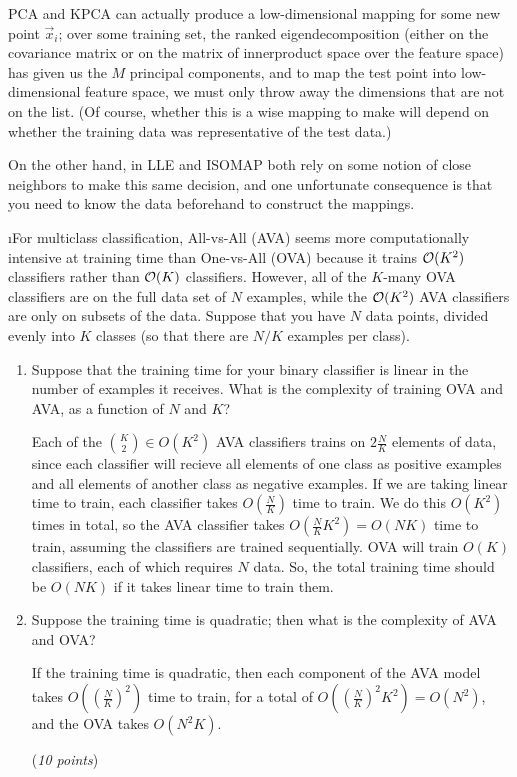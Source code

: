 \documentclass[fleqn]{article}
\begin{document}
\begin{solution}
PCA and KPCA can actually produce a low-dimensional mapping for some new point $\vec{x}_i$; over some training set, the ranked eigendecomposition (either on the covariance matrix or on the matrix of innerproduct space over the feature space) has given us the $M$ principal components, and to map the test point into low-dimensional feature space, we must only throw away the dimensions that are not on the list. (Of course, whether this is a wise mapping to make will depend on whether the training data was representative of the test data.) \newline

On the other hand, in LLE and ISOMAP both rely on some notion of close neighbors to make this same decision, and one unfortunate consequence is that you need to know the data beforehand to construct the mappings.
\end{solution}

\i For multiclass classification, All-vs-All (AVA) seems more computationally 
intensive at training time than One-vs-All (OVA) because it trains $\mathcal{O}(K^2)$ 
classifiers rather than $\mathcal{O}(K)$ classifiers.  However, all of the $K$-many OVA
classifiers are on the full data set of $N$ examples, while the
$\mathcal{O}(K^2)$ AVA classifiers are only on subsets of the data.  Suppose
that you have $N$ data points, divided evenly into $K$ classes (so
that there are $N/K$ examples per class).

\begin{enumerate}
\item Suppose that the training time for your binary classifier is
  linear in the number of examples it receives.  What is the
  complexity of training OVA and AVA, as a function of $N$ and $K$?

\begin{solution}
Each of the ${K \choose 2} \in O(K^2)$ AVA classifiers trains on $2 \frac{N}{K}$ elements of data, since each classifier will recieve all elements of one class as positive examples and all elements of another class as negative examples. If we are taking linear time to train, each classifier takes $O(\frac{N}{K})$ time to train. We do this $O(K^2)$ times in total, so the AVA classifier takes $O(\frac{N}{K}K^2) = O(NK)$ time to train, assuming the classifiers are trained sequentially. OVA will train $O(K)$ classifiers, each of which requires $N$ data. So, the total training time should be $O(NK)$ if it takes linear time to train them.
\end{solution}

\item Suppose the training time is quadratic; then what is the
  complexity of AVA and OVA?


\begin{solution}
If the training time is quadratic, then each component of the AVA model takes $O((\frac{N}{K})^2)$ time to train, for a total of $O((\frac{N}{K})^2 K^2) = O(N^2)$, and the OVA takes $O(N^2K)$.
\end{solution}

 (\emph{10 points})

\end{enumerate}
\end{document}
